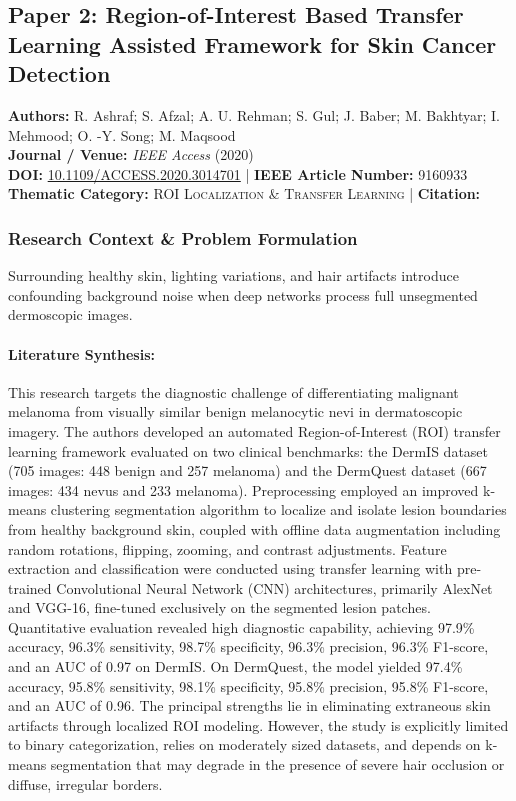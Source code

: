 \subsection{Paper 2: Region-of-Interest Based Transfer Learning Assisted Framework for Skin Cancer Detection}
\label{sec:paper_2}

\begin{tcolorbox}[colback=gray!5!white,colframe=gray!75!black,title=\textbf{Metadata \& Citation Summary}]
\textbf{Authors:} R. Ashraf; S. Afzal; A. U. Rehman; S. Gul; J. Baber; M. Bakhtyar; I. Mehmood; O. -Y. Song; M. Maqsood \\
\textbf{Journal / Venue:} \textit{IEEE Access} (2020) \\
\textbf{DOI:} \href{https://doi.org/10.1109/ACCESS.2020.3014701}{10.1109/ACCESS.2020.3014701} \quad | \quad \textbf{IEEE Article Number:} 9160933 \\
\textbf{Thematic Category:} \textsc{ROI Localization \& Transfer Learning} \quad | \quad \textbf{Citation:} \cite{9160933}
\end{tcolorbox}

\subsubsection*{Research Context \& Problem Formulation}
Surrounding healthy skin, lighting variations, and hair artifacts introduce confounding background noise when deep networks process full unsegmented dermoscopic images.

\paragraph{Literature Synthesis:} This research targets the diagnostic challenge of differentiating malignant melanoma from visually similar benign melanocytic nevi in dermatoscopic imagery. The authors developed an automated Region-of-Interest (ROI) transfer learning framework evaluated on two clinical benchmarks: the DermIS dataset (705 images: 448 benign and 257 melanoma) and the DermQuest dataset (667 images: 434 nevus and 233 melanoma). Preprocessing employed an improved k-means clustering segmentation algorithm to localize and isolate lesion boundaries from healthy background skin, coupled with offline data augmentation including random rotations, flipping, zooming, and contrast adjustments. Feature extraction and classification were conducted using transfer learning with pre-trained Convolutional Neural Network (CNN) architectures, primarily AlexNet and VGG-16, fine-tuned exclusively on the segmented lesion patches. Quantitative evaluation revealed high diagnostic capability, achieving 97.9\% accuracy, 96.3\% sensitivity, 98.7\% specificity, 96.3\% precision, 96.3\% F1-score, and an AUC of 0.97 on DermIS. On DermQuest, the model yielded 97.4\% accuracy, 95.8\% sensitivity, 98.1\% specificity, 95.8\% precision, 95.8\% F1-score, and an AUC of 0.96. The principal strengths lie in eliminating extraneous skin artifacts through localized ROI modeling. However, the study is explicitly limited to binary categorization, relies on moderately sized datasets, and depends on k-means segmentation that may degrade in the presence of severe hair occlusion or diffuse, irregular borders.

